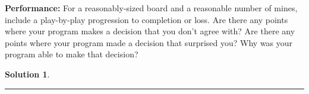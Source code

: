 \documentclass{article}
\theoremstyle{definition}
\def\fline{\rule{0.75\linewidth}{0.5pt}}
\newcommand{\finishline}{\vspace{-15pt}\begin{center}\fline\end{center}}
\newtheorem*{solution*}{Solution}
\newenvironment{solution}{\begin{solution*}}{{\finishline} \end{solution*}}
\begin{document}
\textbf{Performance: }
	For a reasonably-sized board and a reasonable number of mines, include a play-by-play progression to completion or loss. Are there any points where your program makes a decision that you don’t agree with?
Are there any points where your program made a decision that surprised you? 
Why was your program able to make that decision? 
\begin{solution} \hfill

    \begin{figure}[H]
	\centering
	\end{figure}


\end{solution}
\end{document}
